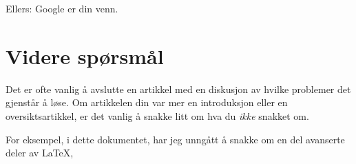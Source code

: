 \documentclass[11pt, a4paper]{article}
\begin{document}
Ellers: Google er din venn.


\section{Videre spørsmål}

Det er ofte vanlig å avslutte en artikkel med en diskusjon av hvilke problemer det gjenstår å løse. Om artikkelen din var mer en introduksjon eller en oversiktsartikkel, er det vanlig å snakke litt om hva du \emph{ikke} snakket om.

For eksempel, i dette dokumentet, har jeg unngått å snakke om en del avanserte deler av \LaTeX, 
\end{document}
